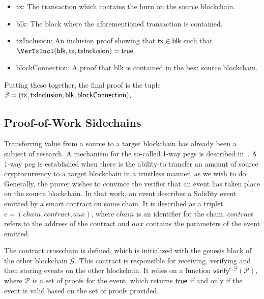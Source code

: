 \begin{itemize}
  \item \textsf{tx}: The transaction which contains the burn on the source blockchain.
  \item \textsf{blk}: The block where the aforementioned transaction is contained.
  \item \textsf{txInclusion}: An inclusion proof showing that $\mathsf{tx} \in \mathsf{blk}$ such that $\VerTxIncl(\textsf{blk}, \textsf{tx}, \textsf{txInclusion}) = \true$.
  \item \textsf{blockConnection}: A proof that \textsf{blk} is contained in the best source blockchain.
\end{itemize}

Putting these together, the final proof is the tuple $\beta = \sf(tx, txInclusion, blk, blockConnection)$.

\subsection{Proof-of-Work Sidechains}
Transferring value from a source to a target blockchain has already been a subject of research. A mechanism for the so-called 1-way pegs is described in~\cite{pow-sidechains}. A 1-way peg is established when there is the ability to transfer an amount of source cryptocurrency to a target blockchain in a trustless manner, as we wish to do. Generally, the prover wishes to convince the verifier that an event has taken place on the source blockchain. In that work, an event describes a Solidity event emitted by a smart contract on some chain. It is described as a triplet $e = (chain, contract, aux)$, where $chain$ is an identifier for the chain, $contract$ refers to the address of the contract and $aux$ contains the parameters of the event emitted.

The contract \textsf{crosschain} is defined, which is initialized with the genesis block of the other blockchain $\mathcal{G}$. This contract is responsible for receiving, verifying and then storing events on the other blockchain. It relies on a function $\mathsf{verify}^{e,\mathcal{G}}(\mathcal{P})$, where $\mathcal{P}$ is a set of proofs for the event, which returns $\mathsf{true}$ if and only if the event is valid based on the set of proofs provided.


